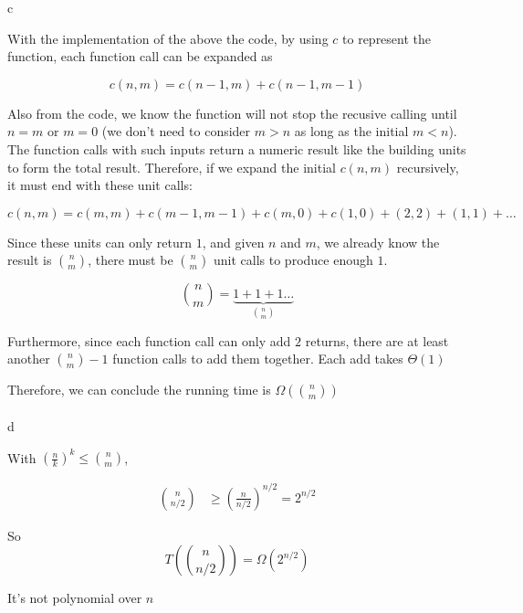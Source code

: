 \documentclass{article}
\begin{document}
c

With the implementation of the above the code, by using $c$ to represent the function, each function call can be expanded as

$$
    c(n, m) = c(n-1, m) + c(n-1, m-1)
$$

Also from the code, we know the function will not stop the recusive calling  until $n = m$ or $m = 0$ (we don't need to consider $m > n$ as long as the initial $m < n$). The function calls with such inputs return a numeric result like the building units to form the total result. Therefore, if we expand the initial $c(n, m)$ recursively, it must end with these unit calls:

$$
    c(n, m) = c(m, m) + c(m-1, m-1) + c(m, 0) + c(1, 0) + (2, 2) + (1, 1) + \dots
$$

Since these units can only return $1$, and given $n$ and $m$, we already know the result is ${n \choose m}$, there must be ${n \choose m}$ unit calls to produce enough $1$.

$$
{n \choose m} = \underbrace{1+1+1\dots}_{n \choose m}
$$

Furthermore, since each function call can only add $2$ returns, there are at least another ${n \choose m}-1$ function calls to add them together. Each add takes $\Theta(1)$

Therefore, we can conclude the running time is $\Omega({n \choose m})$


\paragraph{}

d

With $(\frac{n}{k})^k \le {n \choose m}$,

$$\begin{aligned}
{n \choose n/2} &\ge (\frac{n}{n/2})^{n/2}=2^{n/2}
\end{aligned}$$

So
$$
T({n \choose n/2}) = \Omega(2^{n/2})
$$

It's not polynomial over $n$
\end{document}
